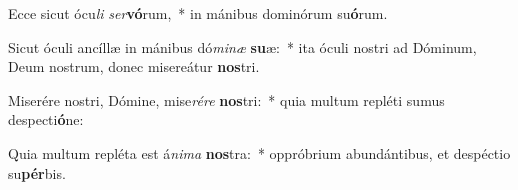 \item Ecce sicut ócu\textit{li} \textit{ser}\textbf{vó}rum,~* in mánibus dominórum su\textbf{ó}rum.
\item Sicut óculi ancíllæ in mánibus dó\textit{mi}\textit{næ} \textbf{su}æ:~* ita óculi nostri ad Dóminum, Deum nostrum, donec misereátur \textbf{nos}tri.
\item Miserére nostri, Dómine, mise\textit{ré}\textit{re} \textbf{nos}tri:~* quia multum repléti sumus despecti\textbf{ó}ne:
\item Quia multum repléta est á\textit{ni}\textit{ma} \textbf{nos}tra:~* oppróbrium abundántibus, et despéctio su\textbf{pér}bis.
